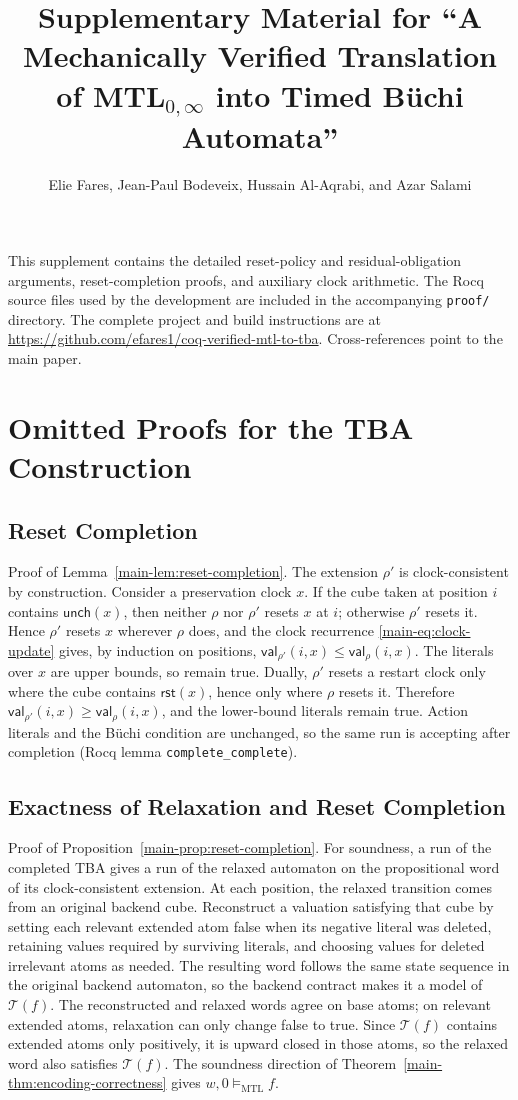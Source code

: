 \documentclass[10pt,journal,compsoc]{IEEEtran}
\title{Supplementary Material for ``A Mechanically Verified Translation of MTL$_{0,\infty}$ into Timed B\"uchi Automata''}
\author{Elie Fares, Jean-Paul Bodeveix, Hussain Al-Aqrabi, and Azar Salami}
\newcommand{\satM}{\models_{\mathrm{MTL}}}
\newcommand{\Reset}{\mathsf{rst}}
\newcommand{\Unch}{\mathsf{unch}}
\newcommand{\T}{\mathcal{T}}
\newcommand{\CVal}{\mathsf{val}}
\begin{document}
\maketitle

This supplement contains the detailed reset-policy and residual-obligation
arguments, reset-completion proofs, and auxiliary clock arithmetic. The
Rocq source files used by the development are included in the accompanying
\texttt{proof/} directory. The complete project and build instructions are at
\url{https://github.com/efares1/coq-verified-mtl-to-tba}. Cross-references
point to the main paper.

\section{Omitted Proofs for the TBA Construction}
\label{sec:supp-proofs}

\subsection{Reset Completion}
\label{subsec:reset-completion-proof}
Proof of Lemma~\ref{main-lem:reset-completion}. The extension $\rho'$ is
clock-consistent by construction. Consider a preservation clock $x$. If the
cube taken at position $i$ contains $\Unch(x)$, then neither $\rho$ nor
$\rho'$ resets $x$ at $i$; otherwise $\rho'$ resets it. Hence $\rho'$ resets
$x$ wherever $\rho$ does, and the clock recurrence
\eqref{main-eq:clock-update} gives, by induction on positions,
$\CVal_{\rho'}(i,x)\le\CVal_\rho(i,x)$. The literals over $x$ are upper
bounds, so remain true. Dually, $\rho'$ resets a restart clock only where
the cube contains $\Reset(x)$, hence only where $\rho$ resets it. Therefore
$\CVal_{\rho'}(i,x)\ge\CVal_\rho(i,x)$, and the lower-bound literals
remain true. Action literals and the B\"uchi condition are unchanged, so the
same run is accepting after completion (Rocq lemma
\texttt{complete\_complete}).

\subsection{Exactness of Relaxation and Reset Completion}
Proof of Proposition~\ref{main-prop:reset-completion}. For soundness, a run of the
completed TBA gives a run of the relaxed automaton on the propositional word
of its clock-consistent extension. At each position, the relaxed transition
comes from an original backend cube. Reconstruct a valuation satisfying that
cube by setting each relevant extended atom false when its negative literal
was deleted, retaining values required by surviving literals, and choosing
values for deleted irrelevant atoms as needed. The resulting word follows the
same state sequence in the original backend automaton, so the backend contract
makes it a model of $\T(f)$. The reconstructed and relaxed words agree on base
atoms; on relevant extended atoms, relaxation can only change false to true.
Since $\T(f)$ contains extended atoms only positively, it is upward closed in
those atoms, so the relaxed word also satisfies $\T(f)$. The soundness
direction of Theorem~\ref{main-thm:encoding-correctness} gives
$w,0\satM f$.
\end{document}
